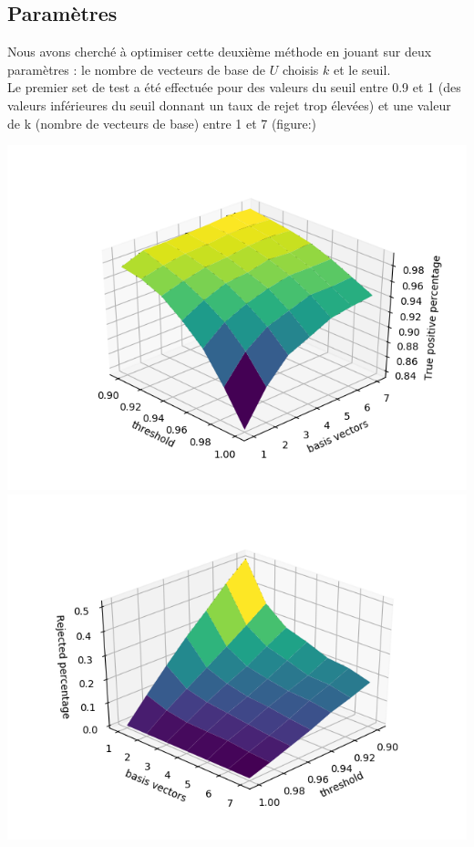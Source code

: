 \documentclass[a4paper,11pt,twoside]{report}
\begin{document}
\subsection{Paramètres}
Nous avons cherché à optimiser cette deuxième méthode en jouant sur deux paramètres : le nombre de vecteurs de base de $U$ choisis $k$ et le seuil.\\
Le premier set de test a été effectuée pour des valeurs du seuil entre 0.9 et 1 (des valeurs inférieures du seuil donnant un taux de rejet trop élevées) et une valeur de k (nombre de vecteurs de base) entre 1 et 7 (figure:)

\includegraphics[scale=0.75]{Graphs/True positifs-1.png} \\

\includegraphics[scale=0.75]{Graphs/Rejected-1.png} \\
\end{document}
